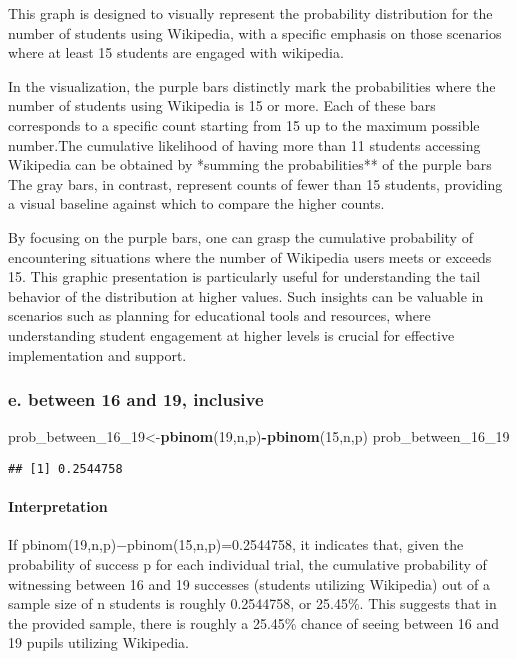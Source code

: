 \documentclass[
]{article}
\newenvironment{Shaded}{\begin{snugshade}}{\end{snugshade}}
\newcommand{\DecValTok}[1]{\textcolor[rgb]{0.00,0.00,0.81}{#1}}
\newcommand{\FunctionTok}[1]{\textcolor[rgb]{0.13,0.29,0.53}{\textbf{#1}}}
\newcommand{\NormalTok}[1]{#1}
\newcommand{\OtherTok}[1]{\textcolor[rgb]{0.56,0.35,0.01}{#1}}
\newcommand{\SpecialCharTok}[1]{\textcolor[rgb]{0.81,0.36,0.00}{\textbf{#1}}}
\begin{document}
This graph is designed to visually represent the probability
distribution for the number of students using Wikipedia, with a specific
emphasis on those scenarios where at least 15 students are engaged with
wikipedia.

In the visualization, the purple bars distinctly mark the probabilities
where the number of students using Wikipedia is 15 or more. Each of
these bars corresponds to a specific count starting from 15 up to the
maximum possible number.The cumulative likelihood of having more than 11
students accessing Wikipedia can be obtained by *summing the
probabilities** of the purple bars The gray bars, in contrast, represent
counts of fewer than 15 students, providing a visual baseline against
which to compare the higher counts.

By focusing on the purple bars, one can grasp the cumulative probability
of encountering situations where the number of Wikipedia users meets or
exceeds 15. This graphic presentation is particularly useful for
understanding the tail behavior of the distribution at higher values.
Such insights can be valuable in scenarios such as planning for
educational tools and resources, where understanding student engagement
at higher levels is crucial for effective implementation and support.

\subsubsection{e. between 16 and 19,
inclusive}\label{e.-between-16-and-19-inclusive}

\begin{Shaded}
\begin{Highlighting}[]
\NormalTok{prob\_between\_16\_19}\OtherTok{\textless{}{-}}\FunctionTok{pbinom}\NormalTok{(}\DecValTok{19}\NormalTok{,n,p)}\SpecialCharTok{{-}}\FunctionTok{pbinom}\NormalTok{(}\DecValTok{15}\NormalTok{,n,p)}
\NormalTok{prob\_between\_16\_19}
\end{Highlighting}
\end{Shaded}

\begin{verbatim}
## [1] 0.2544758
\end{verbatim}

\paragraph{Interpretation}\label{interpretation-9}

If pbinom(19,n,p)−pbinom(15,n,p)=0.2544758, it indicates that, given the
probability of success p for each individual trial, the cumulative
probability of witnessing between 16 and 19 successes (students
utilizing Wikipedia) out of a sample size of n students is roughly
0.2544758, or 25.45\%. This suggests that in the provided sample, there
is roughly a 25.45\% chance of seeing between 16 and 19 pupils utilizing
Wikipedia.
\end{document}
